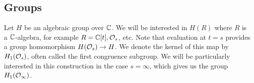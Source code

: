 \documentclass[draft]{article} %
\begin{document}
\subsection{Groups}
\label{ss:groups}
% 
Let $H $ be an algebraic group over $ \mathbb C $.  We will be interested in $ H(R)$ where $ R $ is a $\mathbb C$-algebra, for example $R = \mathbb C[t], \mathcal O_s$, etc.  
% 
% 
Note that evaluation at $ t = s$ provides a group homomorphism $ H(\mathcal O_s) \rightarrow H$.  We denote the kernel of this map by $ H_1(\mathcal O_s)$, often called the  first congruence subgroup.  We will be particularly interested in this construction in the case $ s = \infty$, which gives us the group $ H_1(\mathcal O_\infty)$.
\end{document}

